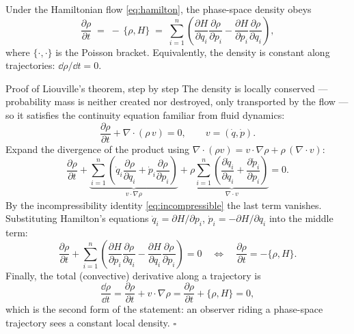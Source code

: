 \begin{theorem}[Liouville]\label{thm:liouville}
Under the Hamiltonian flow \eqref{eq:hamilton}, the phase-space density obeys
\begin{equation}
  \frac{\partial \rho}{\partial t}
  \;=\; -\,\{\rho, H\}
  \;=\; \sum_{i=1}^n \left(
    \frac{\partial H}{\partial q_i}\frac{\partial \rho}{\partial p_i}
    - \frac{\partial H}{\partial p_i}\frac{\partial \rho}{\partial q_i}
  \right),
  \label{eq:liouville}
\end{equation}
where $\{\cdot,\cdot\}$ is the Poisson bracket. Equivalently, the density is
constant along trajectories: $\dd \rho / \dd t = 0$.
\end{theorem}

\begin{toolbox}{Proof of Liouville's theorem, step by step}
The density is locally conserved --- probability mass is neither created nor
destroyed, only transported by the flow --- so it satisfies the continuity
equation familiar from fluid dynamics:
\begin{equation*}
  \frac{\partial \rho}{\partial t} + \nabla \cdot (\rho\, v) = 0,
  \qquad v = (\dot q, \dot p).
\end{equation*}
Expand the divergence of the product using
$\nabla \cdot (\rho v) = v \cdot \nabla \rho + \rho\, (\nabla \cdot v)$:
\begin{equation*}
  \frac{\partial \rho}{\partial t}
  + \underbrace{\sum_{i=1}^n \left(
      \dot q_i \frac{\partial \rho}{\partial q_i}
      + \dot p_i \frac{\partial \rho}{\partial p_i}\right)}_{v \cdot \nabla \rho}
  + \rho \underbrace{\sum_{i=1}^n \left(
      \frac{\partial \dot q_i}{\partial q_i}
      + \frac{\partial \dot p_i}{\partial p_i}\right)}_{\nabla \cdot v}
  = 0 .
\end{equation*}
By the incompressibility identity \eqref{eq:incompressible} the last term
vanishes. Substituting Hamilton's equations
$\dot q_i = \partial H/\partial p_i$, $\dot p_i = -\partial H/\partial q_i$
into the middle term:
\begin{equation*}
  \frac{\partial \rho}{\partial t}
  + \sum_{i=1}^n \left(
      \frac{\partial H}{\partial p_i}\frac{\partial \rho}{\partial q_i}
      - \frac{\partial H}{\partial q_i}\frac{\partial \rho}{\partial p_i}
    \right) = 0
  \quad\Longleftrightarrow\quad
  \frac{\partial \rho}{\partial t} = -\{\rho, H\}.
\end{equation*}
Finally, the total (convective) derivative along a trajectory is
\begin{equation*}
  \frac{\dd \rho}{\dd t}
  = \frac{\partial \rho}{\partial t} + v \cdot \nabla \rho
  = \frac{\partial \rho}{\partial t} + \{\rho, H\}
  = 0 ,
\end{equation*}
which is the second form of the statement: an observer riding a phase-space
trajectory sees a constant local density. \hfill$\square$
\end{toolbox}

